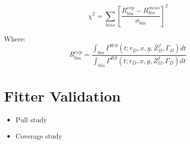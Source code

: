 \documentclass[note.tex]{subfiles}
\begin{document}
\begin{equation}
    \chi^2 = \sum_{bins}\left[\frac{R^{exp}_{bin} - R^{meas}_{bin}}{\sigma_{bin}}\right]^2
    \label{Unconstrained Chi2}
\end{equation}

Where:
\begin{equation}
    R^{exp}_{bin} = \frac{\int_{bin}\Gamma^{WS}(t; r_D, x, y, Z_\Omega^f, \Gamma_D)dt}{\int_{bin}\Gamma^{RS}(t; r_D, x, y, Z_\Omega^f, \Gamma_D)dt}
    \label{Expected Bin Population}
\end{equation}


\section{Fitter Validation}
\begin{itemize}
    \item Pull study
    \item Coverage study
\end{itemize}
\end{document}
